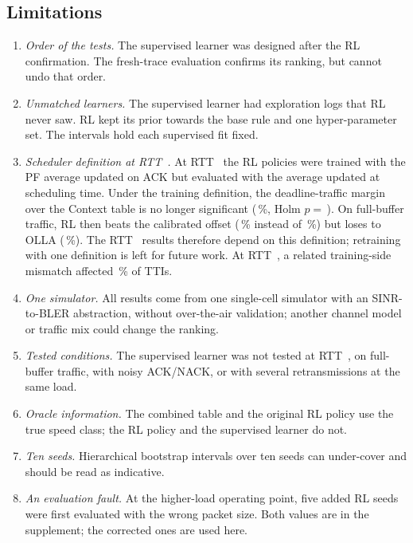 \subsection{Limitations}\label{sec:limits}
\begin{enumerate}
\item \emph{Order of the tests.} The supervised learner was designed after the RL confirmation. The fresh-trace evaluation confirms its ranking, but cannot undo that order.
\item \emph{Unmatched learners.} The supervised learner had exploration logs that RL never saw. RL kept its prior towards the base rule and one hyper-parameter set. The intervals hold each supervised fit fixed.
\item \emph{Scheduler definition at RTT~.} At RTT~ the RL policies were trained with the PF average updated on ACK but evaluated with the average updated at scheduling time. Under the training definition, the deadline-traffic margin over the Context table is no longer significant (\NDpfMtwoAckCtxMar\,\%, Holm $p={}$\,\NDpfMtwoAckCtxHolm). On full-buffer traffic, RL then beats the calibrated offset (\NDpfMfourAckFixedMar\,\% instead of \NDpfMfourSchedFixedMar\,\%) but loses to OLLA (\NDpfMfourAckOllaMar\,\%). The RTT~ results therefore depend on this definition; retraining with one definition is left for future work. At RTT~\NCfgRtt, a related training-side mismatch affected \NDrsShare\,\% of TTIs.
\item \emph{One simulator.} All results come from one single-cell simulator with an SINR-to-BLER abstraction, without over-the-air validation; another channel model or traffic mix could change the ranking.
\item \emph{Tested conditions.} The supervised learner was not tested at RTT~, on full-buffer traffic, with noisy ACK/NACK, or with several retransmissions at the same load.
\item \emph{Oracle information.} The combined table and the original RL policy use the true speed class; the RL policy and the supervised learner do not.
\item \emph{Ten seeds.} Hierarchical bootstrap intervals over ten seeds can under-cover and should be read as indicative.
\item \emph{An evaluation fault.} At the higher-load operating point, five added RL seeds were first evaluated with the wrong packet size. Both values are in the supplement; the corrected ones are used here.
\end{enumerate}
